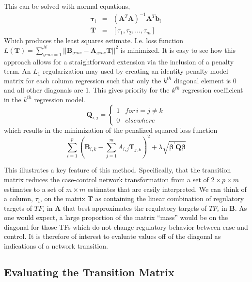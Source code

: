 \documentclass[9pt,twocolumn,twoside]{pnas-new}
\begin{document}
This can be solved with normal equations, 
\begin{eqnarray*}
\mathbf{\tau}_{i} & = & \left(\mathbf{A}^{T}\mathbf{A}\right)^{-1}\mathbf{A}^{T}\mathbf{b}_{i}\\
\mathbf{T} & = & \left[\tau_{1},\tau_{2},\dots,\tau_{m}\right]
\end{eqnarray*}
Which produces the least squares estimate. I.e. loss function $L\left(\mathbf{T}\right)=\sum_{gene=1}^{N}||\mathbf{B}_{gene}-\mathbf{A}_{gene}\mathbf{T}||^{2}$
is minimized. It is easy to see how this approach allows for a straightforward extension via the inclusion of a penalty term.
An $L_{1}$ regularization\cite{tibshirani1996regression} may used by creating an identity penalty
model matrix for each column regression such that only the $k^{th}$
diagonal element is 0 and all other diagonals are 1. This gives priority
for the $k^{th}$ regression coefficient in the $k^{th}$ regression
model. 
\[
\mathbf{Q}_{i,j}=\begin{cases}
1 & for\,i=j\ne k\\
0 & elsewhere
\end{cases}
\]
which results in the minimization of the penalized squared loss function
\[
\sum_{i=1}^{p}\left(\mathbf{B}_{i,k}-\sum_{j=1}^{m}A_{i,j}\mathbf{T}_{j,k}\right)^{2}+\lambda\mathbf{\sqrt{\beta^{\prime}Q\beta}}
\]

This illustrates a key feature of this method. Specifically,
that the transition matrix reduces the case-control network transformation
from a set of $2\times p\times m$ estimates to a set of $m\times m$
estimates that are easily interpreted. We can think of a column, $\tau_{i}$,
on the matrix $\mathbf{T}$ as containing the linear combination of
regulatory targets of $TF_{i}$ in $\mathbf{A}$ that best approximates
the regulatory targets of $TF_{i}$ in $\mathbf{B}$. As one would
expect, a large proportion of the matrix ``mass'' would be on the
diagonal for those TFs which do not change regulatory behavior between
case and control. It is therefore of interest to evaluate values off
of the diagonal as indications of a network transition.

\subsection*{Evaluating the Transition Matrix}
\end{document}
